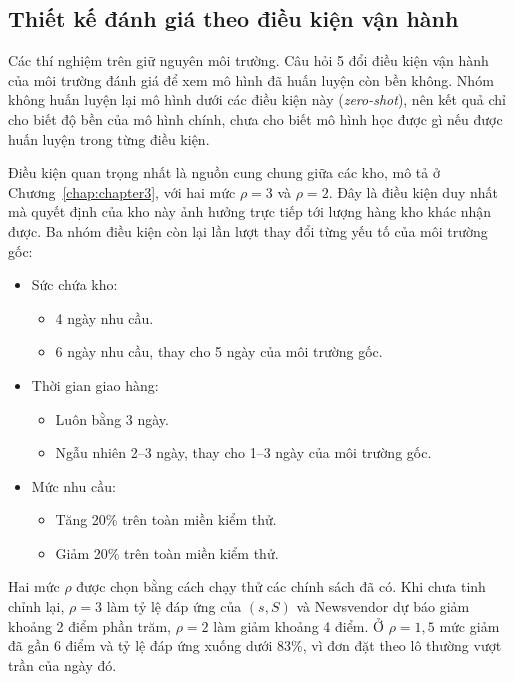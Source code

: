 \subsection{Thiết kế đánh giá theo điều kiện vận hành}
\label{subsec:dieuKien}

Các thí nghiệm trên giữ nguyên môi trường. Câu hỏi 5 đổi điều kiện vận hành của môi trường đánh giá để xem mô hình đã huấn luyện còn bền không. Nhóm không huấn luyện lại mô hình dưới các điều kiện này (\textit{zero-shot}), nên kết quả chỉ cho biết độ bền của mô hình chính, chưa cho biết mô hình học được gì nếu được huấn luyện trong từng điều kiện.

Điều kiện quan trọng nhất là nguồn cung chung giữa các kho, mô tả ở Chương~\ref{chap:chapter3}, với hai mức $\rho = 3$ và $\rho = 2$. Đây là điều kiện duy nhất mà quyết định của kho này ảnh hưởng trực tiếp tới lượng hàng kho khác nhận được. Ba nhóm điều kiện còn lại lần lượt thay đổi từng yếu tố của môi trường gốc:
\begin{itemize}
    \item Sức chứa kho:
    \begin{itemize}
        \item 4 ngày nhu cầu.
        \item 6 ngày nhu cầu, thay cho 5 ngày của môi trường gốc.
    \end{itemize}
    \item Thời gian giao hàng:
    \begin{itemize}
        \item Luôn bằng 3 ngày.
        \item Ngẫu nhiên 2--3 ngày, thay cho 1--3 ngày của môi trường gốc.
    \end{itemize}
    \item Mức nhu cầu:
    \begin{itemize}
        \item Tăng 20\% trên toàn miền kiểm thử.
        \item Giảm 20\% trên toàn miền kiểm thử.
    \end{itemize}
\end{itemize}

Hai mức $\rho$ được chọn bằng cách chạy thử các chính sách đã có. Khi chưa tinh chỉnh lại, $\rho = 3$ làm tỷ lệ đáp ứng của $(s, S)$ và Newsvendor dự báo giảm khoảng 2 điểm phần trăm, $\rho = 2$ làm giảm khoảng 4 điểm. Ở $\rho = 1{,}5$ mức giảm đã gần 6 điểm và tỷ lệ đáp ứng xuống dưới 83\%, vì đơn đặt theo lô thường vượt trần của ngày đó.

